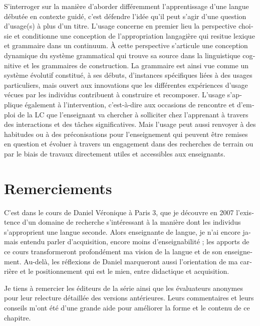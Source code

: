 \documentclass[output=paper]{langscibook}
\begin{document}
\begin{otherlanguage}{french}
\begin{sloppypar}\noindent
S'interroger sur la manière d’aborder différemment l’apprentissage d’une langue débutée en contexte guidé, c'est défendre l’idée qu’il peut s’agir d’une question d’usage(s) à plus d’un titre. L’usage concerne en premier lieu la perspective choisie et conditionne une conception de l’appropriation langagière qui resitue lexique et grammaire dans un continuum. À cette perspective s’articule une conception dynamique du système grammatical qui trouve sa source dans la linguistique cognitive et les grammaires de construction. La grammaire est ainsi vue comme un système évolutif constitué, à ses débuts, d’instances spécifiques liées à des usages particuliers, mais ouvert aux innovations que les différentes expériences d’usage vécues par les individus contribuent à construire et recomposer. L’usage s’applique également à l’intervention, c’est-à-dire aux occasions de rencontre et d’emploi de la LC que l’enseignant va chercher à solliciter chez l’apprenant à travers des interactions et des tâches significatives. Mais l’usage peut aussi renvoyer à des habitudes ou à des préconisations pour l’enseignement qui peuvent être remises en question et évoluer à travers un engagement dans des recherches de terrain ou par le biais de travaux directement utiles et accessibles aux enseignants.
\end{sloppypar}

\section*{Remerciements}
C’est dans le cours de Daniel Véronique à Paris 3, que je découvre en 2007 l’existence d’un domaine de recherche s’intéressant à la manière dont les individus s’approprient une langue seconde. Alors enseignante de langue, je n’ai encore jamais entendu parler d’acquisition, encore moins d’enseignabilité ; les apports de ce cours transformeront profondément ma vision de la langue et de son enseignement. Au-delà, les réflexions de Daniel marqueront aussi l’orientation de ma carrière et le positionnement qui est le mien, entre didactique et acquisition.

Je tiens à remercier les éditeurs de la série ainsi que les évaluateurs anonymes pour leur relecture détaillée des versions antérieures. Leurs commentaires et leurs conseils m'ont été d'une grande aide pour améliorer la forme et le contenu de ce chapitre.

\label{felce:appendix:A}


\end{otherlanguage}
\end{document}
